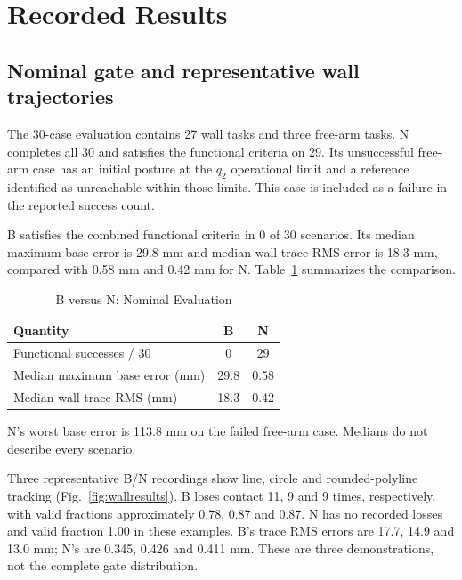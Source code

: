 \documentclass[conference]{IEEEtran}
\begin{document}
\section{Recorded Results}
\subsection{Nominal gate and representative wall trajectories}
The 30-case evaluation contains 27 wall tasks and three free-arm tasks. N completes all 30 and satisfies the functional criteria on 29. Its unsuccessful free-arm case has an initial posture at the $q_2$ operational limit and a reference identified as unreachable within those limits. This case is included as a failure in the reported success count.

B satisfies the combined functional criteria in 0 of 30 scenarios. Its median maximum base error is 29.8 mm and median wall-trace RMS error is 18.3 mm, compared with 0.58 mm and 0.42 mm for N. Table~\ref{tab:gate} summarizes the comparison.

\begin{table}[t]
\caption{B versus N: Nominal Evaluation}
\label{tab:gate}
\centering\footnotesize
\begin{tabular}{lcc}\hline
Quantity & B & N\\\hline
Functional successes / 30 & 0 & 29\\
Median maximum base error (mm) & 29.8 & 0.58\\
Median wall-trace RMS (mm) & 18.3 & 0.42\\\hline
\end{tabular}
\vspace{2pt}
\parbox{.96\columnwidth}{\scriptsize N's worst base error is 113.8 mm on the failed free-arm case. Medians do not describe every scenario.}
\end{table}

Three representative B/N recordings show line, circle and rounded-polyline tracking (Fig.~\ref{fig:wallresults}). B loses contact 11, 9 and 9 times, respectively, with valid fractions approximately 0.78, 0.87 and 0.87. N has no recorded losses and valid fraction 1.00 in these examples. B's trace RMS errors are 17.7, 14.9 and 13.0 mm; N's are 0.345, 0.426 and 0.411 mm. These are three demonstrations, not the complete gate distribution.
\end{document}
